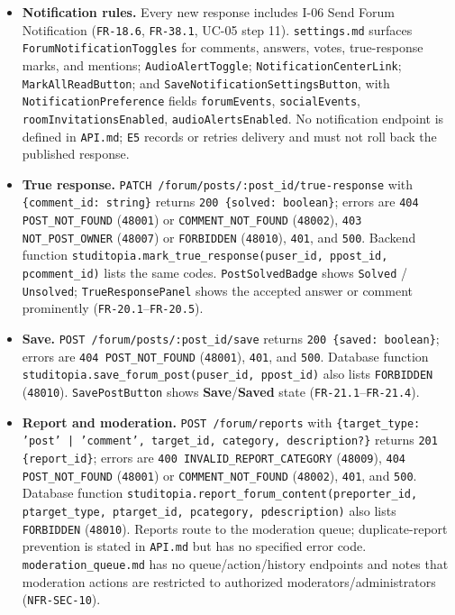 \documentclass[12pt]{article}
\begin{document}
\begin{itemize}
\item \textbf{Notification rules.} Every new response includes I-06 Send Forum Notification (\texttt{FR-18.6}, \texttt{FR-38.1}, UC-05 step 11). \texttt{settings.md} surfaces \texttt{ForumNotificationToggles} for comments, answers, votes, true-response marks, and mentions; \texttt{AudioAlertToggle}; \texttt{NotificationCenterLink}; \texttt{MarkAllReadButton}; and \texttt{SaveNotificationSettingsButton}, with \texttt{NotificationPreference} fields \texttt{forumEvents}, \texttt{socialEvents}, \texttt{roomInvitationsEnabled}, \texttt{audioAlertsEnabled}. No notification endpoint is defined in \texttt{API.md}; \texttt{E5} records or retries delivery and must not roll back the published response.
\item \textbf{True response.} \texttt{PATCH /forum/posts/:post\_id/true-response} with \texttt{\{comment\_id: string\}} returns \texttt{200 \{solved: boolean\}}; errors are \texttt{404 POST\_NOT\_FOUND} (\texttt{48001}) or \texttt{COMMENT\_NOT\_FOUND} (\texttt{48002}), \texttt{403 NOT\_POST\_OWNER} (\texttt{48007}) or \texttt{FORBIDDEN} (\texttt{48010}), \texttt{401}, and \texttt{500}. Backend function \texttt{studitopia.mark\_true\_response(puser\_id, ppost\_id, pcomment\_id)} lists the same codes. \texttt{PostSolvedBadge} shows \texttt{Solved} / \texttt{Unsolved}; \texttt{TrueResponsePanel} shows the accepted answer or comment prominently (\texttt{FR-20.1}--\texttt{FR-20.5}).
\item \textbf{Save.} \texttt{POST /forum/posts/:post\_id/save} returns \texttt{200 \{saved: boolean\}}; errors are \texttt{404 POST\_NOT\_FOUND} (\texttt{48001}), \texttt{401}, and \texttt{500}. Database function \texttt{studitopia.save\_forum\_post(puser\_id, ppost\_id)} also lists \texttt{FORBIDDEN} (\texttt{48010}). \texttt{SavePostButton} shows \textbf{Save}/\textbf{Saved} state (\texttt{FR-21.1}--\texttt{FR-21.4}).
\item \textbf{Report and moderation.} \texttt{POST /forum/reports} with \texttt{\{target\_type: 'post' | 'comment', target\_id, category, description?\}} returns \texttt{201 \{report\_id\}}; errors are \texttt{400 INVALID\_REPORT\_CATEGORY} (\texttt{48009}), \texttt{404 POST\_NOT\_FOUND} (\texttt{48001}) or \texttt{COMMENT\_NOT\_FOUND} (\texttt{48002}), \texttt{401}, and \texttt{500}. Database function \texttt{studitopia.report\_forum\_content(preporter\_id, ptarget\_type, ptarget\_id, pcategory, pdescription)} also lists \texttt{FORBIDDEN} (\texttt{48010}). Reports route to the moderation queue; duplicate-report prevention is stated in \texttt{API.md} but has no specified error code. \texttt{moderation\_queue.md} has no queue/action/history endpoints and notes that moderation actions are restricted to authorized moderators/administrators (\texttt{NFR-SEC-10}).

\end{itemize}
\end{document}
